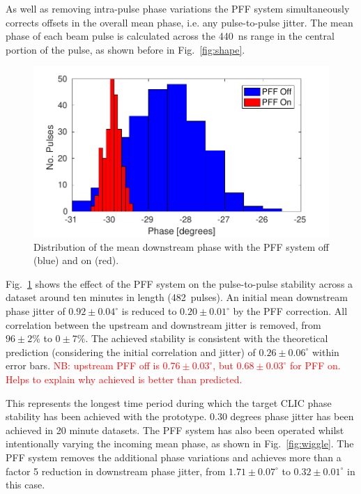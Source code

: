 \documentclass[%
 reprint,
 amsmath,amssymb,
 prl,
]{revtex4-1}
\begin{document}
As well as removing intra-pulse phase variations the PFF system simultaneously 
corrects offsets in the overall mean phase, i.e. any pulse-to-pulse jitter. The 
mean phase of each beam pulse is calculated across the 440~ns range in the 
central portion of the pulse, as shown before in Fig.~\ref{fig:shape}.

\begin{figure}
	\includegraphics[width=\columnwidth]{figs/meanJit}%
	\caption{\label{fig:meanJit}Distribution of the mean downstream phase with 
		the 
		PFF system off (blue) and on (red).}
\end{figure}

Fig.~\ref{fig:meanJit} shows the effect of the PFF system on the pulse-to-pulse 
stability across a dataset around ten minutes in length (482~pulses). An 
initial mean downstream phase jitter of \(0.92\pm0.04^\circ\) is reduced to \(0.20\pm0.01^\circ\) by the PFF 
correction. All correlation between the upstream and downstream jitter is removed, from 
\(96\pm2\%\) to \(0\pm7\%\). The achieved stability is consistent with the theoretical prediction (considering the initial correlation and jitter) of \(0.26\pm0.06^\circ\) within error bars.
\textcolor{red}{NB: upstream PFF off is \(0.76\pm0.03^\circ\), but 
\(0.68\pm0.03^\circ\) for 
PFF on. Helps to explain why achieved is better than predicted.}

This represents the longest time period during which the target CLIC phase 
stability has been achieved with the prototype. 0.30 degrees phase jitter has 
been achieved in 20 minute datasets. The PFF system has also been operated 
whilst intentionally varying the incoming mean phase, as shown in 
Fig.~\ref{fig:wiggle}. The PFF system removes the additional phase variations 
and achieves more than a factor 5 reduction in downstream phase jitter, from 
\(1.71\pm0.07^\circ\) to \(0.32\pm0.01^\circ\) in this case.
\end{document}
